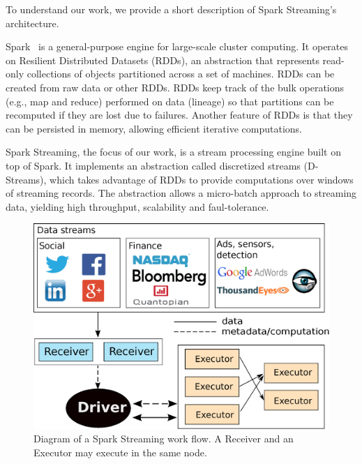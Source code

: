 %
To understand our work, we provide a short description of Spark Streaming's architecture.

Spark~\cite{Spark} is a general-purpose engine for large-scale cluster computing. It operates on Resilient Distributed Datasets (RDDs), an abstraction that represents read-only collections of objects partitioned across a set of machines. RDDs can be created from raw data or other RDDs. 
RDDs keep track of the bulk operations (e.g., map and reduce) performed on data (lineage) so that partitions can be recomputed if they are lost due to failures. 
Another feature of RDDs is that they can be persisted in memory, allowing efficient iterative computations.

Spark Streaming, the focus of our work, is a stream processing engine built on top of Spark.
It implements an abstraction called discretized streams (D-Streams), which takes advantage of RDDs to provide computations over windows of streaming records.
The abstraction allows a micro-batch approach to streaming data, yielding high throughput, scalability and faul-tolerance.

\begin{figure}[t!]
  \begin{center}
    \includegraphics[scale=0.35]{images_graphs/spark_architecture_v4.eps}
  \end{center}
  \caption{Diagram of a Spark Streaming work flow. A Receiver and an Executor may execute in the same node.}
  \label{fig:SparkStreaming_architecture}
\end{figure}

